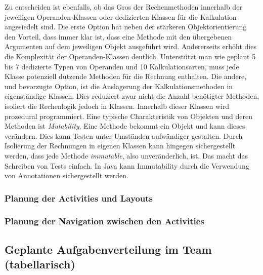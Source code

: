 Zu entscheiden ist ebenfalls, ob das Gros der Rechenmethoden innerhalb der jeweiligen Operanden-Klassen oder dedizierten Klassen für die Kalkulation angesiedelt sind. Die erste Option hat neben der stärkeren Objektorientierung den Vorteil, dass immer klar ist, dass eine Methode mit den übergebenen Argumenten auf dem jeweiligen Objekt ausgeführt wird. Andererseits erhöht dies die Komplexität der Operanden-Klassen deutlich. Unterstützt man wie geplant 5 bis 7 dedizierte Typen von Operanden und 10 Kalkulationsarten, muss jede Klasse potenziell dutzende Methoden für die Rechnung enthalten. Die andere, und bevorzugte Option, ist die Auslagerung der Kalkulationsmethoden in eigenständige Klassen. Dies reduziert zwar nicht die Anzahl benötigter Methoden, isoliert die Rechenlogik jedoch in Klassen. Innerhalb dieser Klassen wird prozedural programmiert.  Eine typische Charakteristik von Objekten und deren Methoden ist \textit{Mutability}. Eine Methode bekommt ein Objekt und kann dieses verändern. Dies kann Testen unter Umständen aufwändiger gestalten. Durch Isolierung der Rechnungen in eigenen Klassen kann hingegen sichergestellt werden, dass jede Methode \textit{immutable}, also unveränderlich, ist. Das macht das Schreiben von Tests einfach. In Java kann Immutability durch die Verwendung von Annotationen sichergestellt werden. 

\subsubsection{Planung der Activities und Layouts}

\subsubsection{Planung der Navigation zwischen den Activities}

\subsection{Geplante Aufgabenverteilung im Team (tabellarisch)}